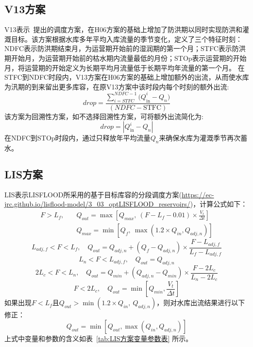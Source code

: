 \subsection{V13方案}
V13表示~\citet{voisin2013improved}提出的调度方案，在H06方案的基础上增加了防洪期以同时实现防洪和灌溉目标。该方案根据水库多年平均入库流量的季节变化，定义了三个特征时刻：NDFC表示防洪期结束月，为运营期开始前的湿润期的第一个月；STFC表示防洪期开始月，为运营期开始前的枯水期内流量最低的月份；STOp表示运营期的开始月，\citet{hanasaki2006reservoir}将运营期的开始定义为长期平均月流量低于长期平均年流量的第一个月。
在STFC到NDFC时段内，V13方案在H06方案的基础上增加额外的出流，从而使水库为汛期的到来留出更多库容，在原V13方案中该时段内每个时刻的额外出流:
\begin{equation}
    drop = \frac{\sum_{i = STFC}^{NDFC - 1}{{(Q}_{\text{in}}^{i} - Q_{n})}}{\left( NDFC - \text{STFC} \right)}
\end{equation}
该方案为回溯性方案，如不选择回溯性方案，可将额外出流简化为:
\begin{equation}
    drop = \left| Q_{\text{in}}^{i} - Q_{n} \right|
\end{equation}
在NDFC到STOp时段内，通过只释放年平均流量$Q_{n}$来确保水库为灌溉季节再次蓄水。

\subsection{LIS方案}
LIS表示LISFLOOD所采用的基于目标库容的分段调度方案(\url{https://ec-jrc.github.io/lisflood-model/3\_03\_optLISFLOOD\_reservoirs/})，计算公式如下：
\begin{equation}
\begin{aligned}
    F > L_{f}, \quad &Q_{out}=\max\left[Q_{max},\ (F-L_{f}-0.01) \times \frac{V_t}{\Delta t}\right] \\
    \quad &Q_{max} = \min\left[Q_{f},\ {\max(1.2 \times Q_{in},Q_{adj,n})}\right]
\end{aligned}
\end{equation}
\begin{equation}
    L_{adj,f} < F < L_{f}, \quad Q_{out}=Q_{adj,n}+\left(Q_{f}-Q_{adj,n}\right) \times \frac{F-L_{adj,f}}{L_{f}-L_{adj,f}}
\end{equation}
\begin{equation}
    L_{n} < F < L_{adj,f}, \quad Q_{out}=Q_{adj,n}
\end{equation}
\begin{equation}
    2L_{c} < F < L_{n}, \quad Q_{out}=Q_{min}+\left(Q_{adj,n}-Q_{min}\right) \times \frac{F-2L_{c}}{L_{n}-2L_{c}}
\end{equation}
\begin{equation}
    F < 2L_{c}, \quad Q_{out}=\min\left[Q_{min}, \frac{V_t}{\Delta t}\right]
\end{equation}
如果出现$F<L_{f}$且$Q_{out}>\min(1.2 \times Q_{in},\ Q_{adj,n})$，则对水库出流结果进行以下修正：
\begin{equation}
    Q_{out} = \min\left[Q_{out}, \max(Q_{in}, Q_{adj,n})\right]
\end{equation}
上式中变量和参数的含义如表~\ref{tab:LIS方案变量参数表} 所示。

